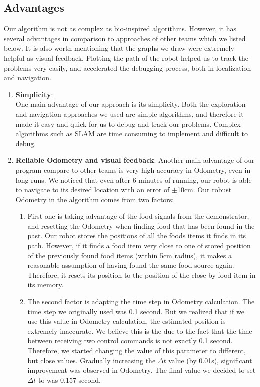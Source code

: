 \documentclass[]{article}
\begin{document}
\subsection{Advantages}
 Our algorithm is not as complex as bio-inspired algorithms. However, it has several advantages in comparison to approaches of other teams which we listed below. It is also worth mentioning that the graphs we draw were extremely helpful as visual feedback. Plotting the path of the robot helped us to track the problems very easily, and accelerated the debugging process, both in localization and navigation.
\begin{enumerate}
 \item \textbf{Simplicity}:\\
 One main advantage of our approach is its simplicity. Both the exploration and navigation approaches we used are simple algorithms, and therefore it made it easy and quick for us to debug and track our problems. Complex algorithms such as SLAM are time consuming to implement and difficult to debug. 
 \item \textbf{Reliable Odometry and visual feedback}:
 Another main advantage of our program compare to other teams is very high accuracy in Odometry, even in long runs. We noticed that even after 6 minutes of running, our robot is able to navigate to its desired location with an error of $\pm$10cm. Our robust Odometry in the algorithm comes from two factors:\\
 \begin{enumerate}
  \item First one is taking advantage of the food signals from the demonstrator, and resetting the Odometry when finding food that has been found in the past. Our robot stores the positions of all the foods items it finds in its path. However, if it finds a food item very close to one of stored position of the previously found food items (within 5cm radius), it makes a reasonable assumption of having found the same food source again. Therefore, it resets its position to the position of the close by food item in its memory.
  \item The second factor is adapting the time step in Odometry calculation. The time step we originally used was 0.1 second. But we realized that if we use this value in Odometry calculation, the estimated position is extremely inaccurate. We believe this is the due to the fact that the time between receiving two control commands is not exactly 0.1 second. Therefore, we started changing the value of this parameter to different, but close values. Gradually increasing the $\Delta t$ value (by 0.01s), significant improvement was observed in Odometry. The final value we decided to set $\Delta t$ to was 0.157 second.
 \end{enumerate}
      

\end{enumerate}
\end{document}
